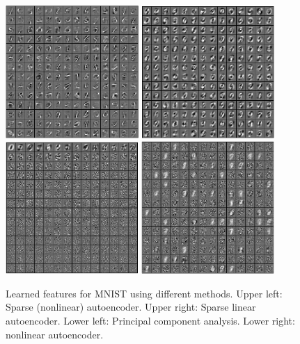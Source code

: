 \documentclass[twocolumn]{article}
\begin{document}
\begin{figure}
  \centering
  \includegraphics[width=0.45\textwidth]{sparsesigmoidnn.png}
  \includegraphics[width=0.45\textwidth]{linearnn.png}
  \includegraphics[width=0.45\textwidth]{pca.png}
  \includegraphics[width=0.45\textwidth]{nonlinearnn.png}
  \caption{Learned features for MNIST using different methods.
      Upper left: Sparse (nonlinear) autoencoder.
      Upper right: Sparse linear autoencoder.
      Lower left: Principal component analysis.
      Lower right: nonlinear autoencoder.
    }
  \label{fig:features}
\end{figure}
\end{document}
